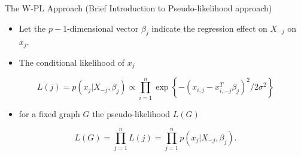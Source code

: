 \documentclass[
  ignorenonframetext,
]{beamer}
\providecommand{\tightlist}{%
  \setlength{\itemsep}{0pt}\setlength{\parskip}{0pt}}\usepackage{longtable,booktabs,array}
\begin{document}
\begin{frame}{The W-PL Approach (Brief Introduction to Pseudo-likelihood
approach)}
\protect\hypertarget{the-w-pl-approach-brief-introduction-to-pseudo-likelihood-approach-1}{}

\begin{itemize}
\tightlist
\item
  Let the \(p − 1\)-dimensional vector \(\beta_j\) indicate the
  regression effect on \(X_{-j}\) on \(x_j\).
\item
  The conditional likelihood of \(x_j\)
\end{itemize}

\[
L(j) = p(x_j | X_{-j}, \beta_j) \propto \prod_{i =1}^n \exp \left\{-(x_{i,j} - x_{i, -j}^T\beta_j)^2/ 2\sigma^2\right\}
\]

\begin{itemize}
\tightlist
\item
  for a fixed graph \(G\) the pseudo-likelihood \(L(G)\)
\end{itemize}

\[
L(G) = \prod_{j =1}^n L(j) = \prod_{j =1}^n p(x_j | X_{-j}, \beta_j). 
\]
\end{frame}
\end{document}
